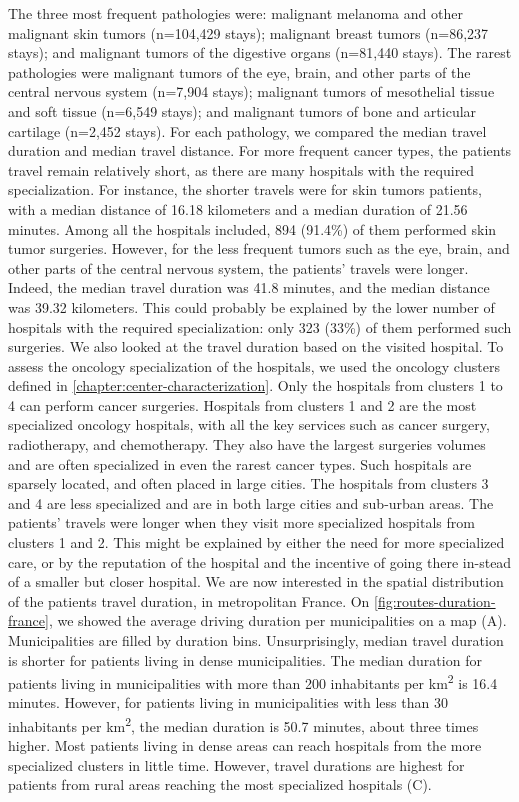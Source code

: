 The three most frequent pathologies were: malignant melanoma and other malignant
skin tumors (n=104,429 stays); malignant breast tumors (n=86,237 stays); and
malignant tumors of the digestive organs (n=81,440 stays). The rarest
pathologies were malignant tumors of the eye, brain, and other parts of the
central nervous system (n=7,904 stays); malignant tumors of mesothelial tissue
and soft tissue (n=6,549 stays); and malignant tumors of bone and articular
cartilage (n=2,452 stays). For each pathology, we compared the median travel
duration and median travel distance. For more frequent cancer types, the
patients travel remain relatively short, as there are many hospitals with the
required specialization. For instance, the shorter travels were for skin tumors
patients, with a median distance of 16.18 kilometers and a median duration of
21.56 minutes. Among all the hospitals included, 894 (91.4\%) of them performed
skin tumor surgeries. However, for the less frequent tumors such as the eye,
brain, and other parts of the central nervous system, the patients' travels were
longer. Indeed, the median travel duration was 41.8 minutes, and the median
distance was 39.32 kilometers. This could probably be explained by the lower
number of hospitals with the required specialization: only 323 (33\%) of them
performed such surgeries. We also looked at the travel duration based on the
visited hospital. To assess the oncology specialization of the hospitals, we
used the oncology clusters defined in \cref{chapter:center-characterization}.
Only the hospitals from clusters 1 to 4 can perform cancer surgeries. Hospitals
from clusters 1 and 2 are the most specialized oncology hospitals, with all the
key services such as cancer surgery, radiotherapy, and chemotherapy. They also
have the largest surgeries volumes and are often specialized in even the rarest
cancer types. Such hospitals are sparsely located, and often placed in large
cities. The hospitals from clusters 3 and 4 are less specialized and are in both
large cities and sub-urban areas. The patients' travels were longer when they
visit more specialized hospitals from clusters 1 and 2. This might be explained
by either the need for more specialized care, or by the reputation of the
hospital and the incentive of going there in-stead of a smaller but closer
hospital. We are now interested in the spatial distribution of the patients
travel duration, in metropolitan France. On \cref{fig:routes-duration-france},
we showed the average driving duration per municipalities on a map (A).
Municipalities are filled by duration bins. Unsurprisingly, median travel
duration is shorter for patients living in dense municipalities. The median
duration for patients living in municipalities with more than 200 inhabitants
per km\textsuperscript{2} is 16.4 minutes. However, for patients living in
municipalities with less than 30 inhabitants per km\textsuperscript{2}, the
median duration is 50.7 minutes, about three times higher. Most patients living
in dense areas can reach hospitals from the more specialized clusters in little
time. However, travel durations are highest for patients from rural areas
reaching the most specialized hospitals (C).

